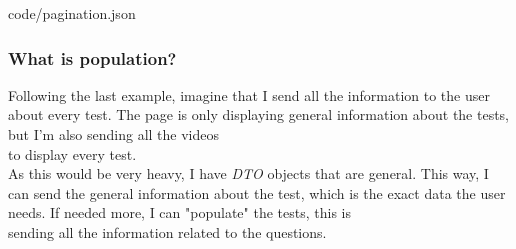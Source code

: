             
            {code/pagination.json}
        
        \subsubsection{What is population?}
            Following the last example, imagine that I send all the information to the user about every test. The page is only displaying general information about the tests, but I'm also sending all the videos \\
            to display every test. \\
            
            As this would be very heavy, I have \textit{DTO} objects that are general. This way, I can send the general information about the test, which is the exact data the user needs. If needed more, I can "populate" the tests, this is \\
            sending all the information related to the questions.

